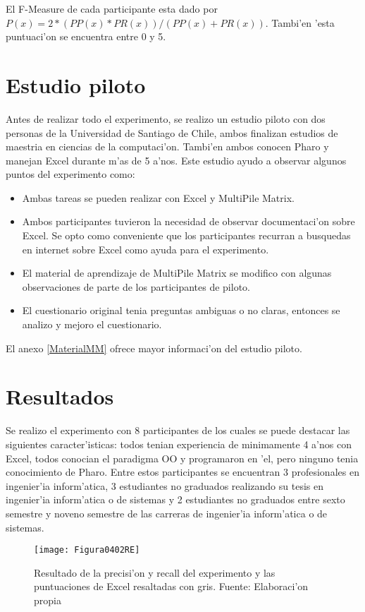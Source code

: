 El F-Measure de cada participante esta dado por $P(x) = 2 * (PP(x) * PR(x)) / (PP(x) + PR(x))$. Tambi'en 'esta puntuaci'on se encuentra entre 0 y 5.

\section{Estudio piloto}
Antes de realizar todo el experimento, se realizo un estudio piloto con dos personas de la Universidad de Santiago de Chile, ambos finalizan estudios de maestria en ciencias de la computaci'on. Tambi'en ambos conocen Pharo y manejan Excel durante m'as de 5 a'nos. Este estudio ayudo a observar algunos puntos del experimento como:

\begin{itemize}
\item Ambas tareas se pueden realizar con Excel y MultiPile Matrix.
\item Ambos participantes tuvieron la necesidad de observar documentaci'on sobre Excel. Se opto como conveniente que los participantes recurran a busquedas en internet sobre Excel como ayuda para el experimento.
\item El material de aprendizaje de MultiPile Matrix se modifico con algunas observaciones de parte de los participantes de piloto.
\item El cuestionario original tenia preguntas ambiguas o no claras, entonces se analizo y mejoro el cuestionario. 
\end{itemize}

El anexo \ref{MaterialMM} ofrece mayor informaci'on del estudio piloto.  

\section{Resultados}
Se realizo el experimento con 8 participantes de los cuales se puede destacar las siguientes caracter'isticas: todos tenian experiencia de minimamente 4 a'nos con Excel, todos conocian el paradigma OO y programaron en 'el, pero ninguno tenia conocimiento de Pharo. Entre estos participantes se encuentran 3 profesionales en ingenier'ia inform'atica, 3 estudiantes no graduados realizando su tesis en ingenier'ia inform'atica o de sistemas y 2 estudiantes no graduados entre sexto semestre y noveno semestre de las carreras de ingenier'ia inform'atica o de sistemas.

\begin{figure}[h]
    \centering
    \texttt{[image: Figura0402RE]}
    \caption{Resultado de la precisi'on y recall del experimento y las puntuaciones de Excel resaltadas con gris. Fuente: Elaboraci'on propia}
    \label{fig:RE}
\end{figure}

